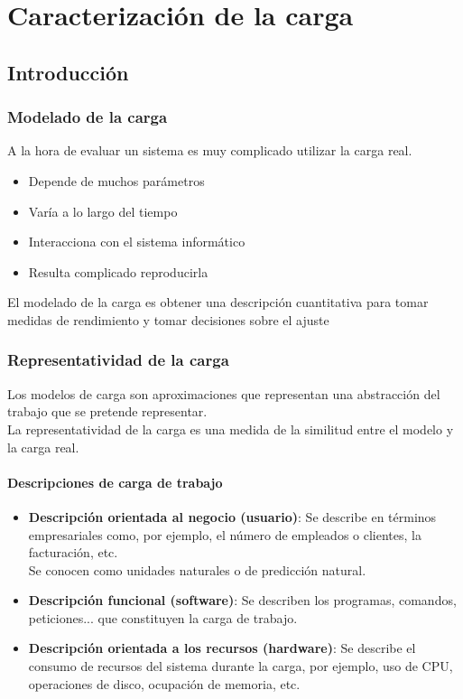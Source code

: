 \chapter{Caracterización de la carga}
\noindent
\section{Introducción}
\subsection{Modelado de la carga}
A la hora de evaluar un sistema es muy complicado utilizar la carga real.
\begin{itemize}
    \item Depende de muchos parámetros
    \item Varía a lo largo del tiempo
    \item Interacciona con el sistema informático
    \item Resulta complicado reproducirla
\end{itemize}
El modelado de la carga es obtener una descripción cuantitativa para tomar medidas de rendimiento y tomar decisiones sobre el ajuste
\subsection{Representatividad de la carga}
Los modelos de carga son aproximaciones que representan una abstracción del trabajo que se pretende representar.\\

La representatividad de la carga es una medida de la similitud entre el modelo y la carga real.
\subsubsection{Descripciones de carga de trabajo}
\begin{itemize}
    \item \textbf{Descripción orientada al negocio (usuario)}: Se describe en términos empresariales como, por ejemplo, el número de empleados o clientes, la facturación, etc.\\
     Se conocen como unidades naturales o de predicción natural.
    \item \textbf{Descripción funcional (software)}: Se describen los programas, comandos, peticiones... que constituyen la carga de trabajo.
    \item \textbf{Descripción orientada a los recursos (hardware)}: Se describe el consumo de recursos del sistema durante la carga, por ejemplo, uso de CPU, operaciones de disco, ocupación de memoria, etc.
\end{itemize}

